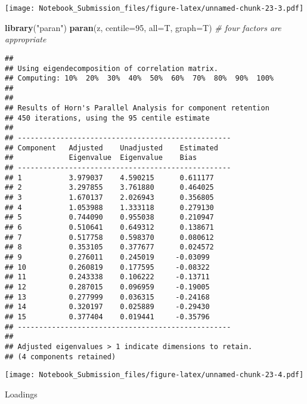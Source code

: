 \documentclass[
]{article}
\newenvironment{Shaded}{\begin{snugshade}}{\end{snugshade}}
\newcommand{\CommentTok}[1]{\textcolor[rgb]{0.56,0.35,0.01}{\textit{#1}}}
\newcommand{\DataTypeTok}[1]{\textcolor[rgb]{0.13,0.29,0.53}{#1}}
\newcommand{\DecValTok}[1]{\textcolor[rgb]{0.00,0.00,0.81}{#1}}
\newcommand{\KeywordTok}[1]{\textcolor[rgb]{0.13,0.29,0.53}{\textbf{#1}}}
\newcommand{\NormalTok}[1]{#1}
\newcommand{\StringTok}[1]{\textcolor[rgb]{0.31,0.60,0.02}{#1}}
\begin{document}
\texttt{[image: Notebook\_Submission\_files/figure-latex/unnamed-chunk-23-3.pdf]}

\begin{Shaded}
\begin{Highlighting}[]
\KeywordTok{library}\NormalTok{(}\StringTok{"paran"}\NormalTok{)}
\KeywordTok{paran}\NormalTok{(z, }\DataTypeTok{centile=}\DecValTok{95}\NormalTok{, }\DataTypeTok{all=}\NormalTok{T, }\DataTypeTok{graph=}\NormalTok{T) }\CommentTok{# four factors are appropriate}
\end{Highlighting}
\end{Shaded}

\begin{verbatim}
## 
## Using eigendecomposition of correlation matrix.
## Computing: 10%  20%  30%  40%  50%  60%  70%  80%  90%  100%
## 
## 
## Results of Horn's Parallel Analysis for component retention
## 450 iterations, using the 95 centile estimate
## 
## -------------------------------------------------- 
## Component   Adjusted    Unadjusted    Estimated 
##             Eigenvalue  Eigenvalue    Bias 
## -------------------------------------------------- 
## 1           3.979037    4.590215      0.611177
## 2           3.297855    3.761880      0.464025
## 3           1.670137    2.026943      0.356805
## 4           1.053988    1.333118      0.279130
## 5           0.744090    0.955038      0.210947
## 6           0.510641    0.649312      0.138671
## 7           0.517758    0.598370      0.080612
## 8           0.353105    0.377677      0.024572
## 9           0.276011    0.245019     -0.03099
## 10          0.260819    0.177595     -0.08322
## 11          0.243338    0.106222     -0.13711
## 12          0.287015    0.096959     -0.19005
## 13          0.277999    0.036315     -0.24168
## 14          0.320197    0.025889     -0.29430
## 15          0.377404    0.019441     -0.35796
## -------------------------------------------------- 
## 
## Adjusted eigenvalues > 1 indicate dimensions to retain.
## (4 components retained)
\end{verbatim}

\texttt{[image: Notebook\_Submission\_files/figure-latex/unnamed-chunk-23-4.pdf]}

Loadings
\end{document}
